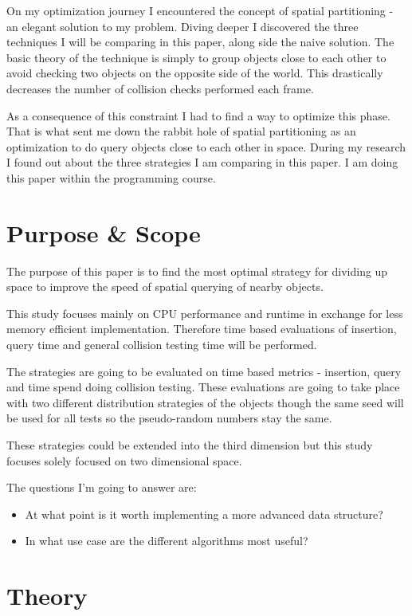 \documentclass[a4paper, 12pt]{article}
\begin{document}
On my optimization journey I encountered the concept of spatial partitioning -
an elegant solution to my problem. Diving deeper I discovered the three
techniques I will be comparing in this paper, along side the naive solution. The
basic theory of the technique is simply to group objects close to each other to
avoid checking two objects on the opposite side of the world. This drastically
decreases the number of collision checks performed each frame.

As a consequence of this constraint I had to find a way to optimize this phase.
That is what sent me down the rabbit hole of spatial partitioning as an
optimization to do query objects close to each other in space. During my
research I found out about the three strategies I am comparing in this paper. I
am doing this paper within the programming course.

\section{Purpose \& Scope}
\label{sec:purpose-and-scope}
The purpose of this paper is to find the most optimal strategy for dividing up
space to improve the speed of spatial querying of nearby objects.

This study focuses mainly on CPU performance and runtime in exchange for less
memory efficient implementation. Therefore time based evaluations of insertion,
query time and general collision testing time will be performed.

The strategies are going to be evaluated on time based metrics - insertion,
query and time spend doing collision testing. These evaluations are going to
take place with two different distribution strategies of the objects though the
same seed will be used for all tests so the pseudo-random numbers stay the same.

These strategies could be extended into the third dimension but this study
focuses solely focused on two dimensional space.

The questions I'm going to answer are:
\begin{itemize}
    \item At what point is it worth implementing a more advanced data structure?
    \item In what use case are the different algorithms most useful?
\end{itemize}

\section{Theory}
\end{document}
